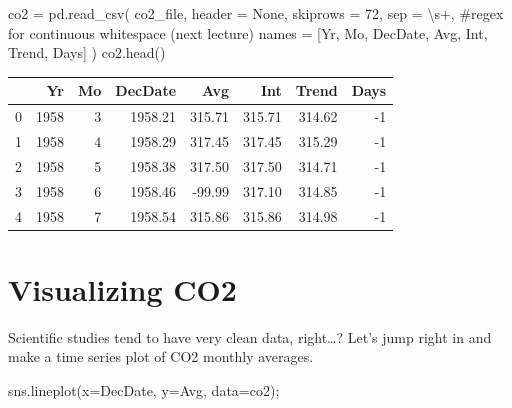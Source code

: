 \documentclass[
  letterpaper,
  DIV=11,
  numbers=noendperiod]{scrreprt}
\newenvironment{Shaded}{\begin{snugshade}}{\end{snugshade}}
\newcommand{\CommentTok}[1]{\textcolor[rgb]{0.37,0.37,0.37}{#1}}
\newcommand{\DecValTok}[1]{\textcolor[rgb]{0.68,0.00,0.00}{#1}}
\newcommand{\NormalTok}[1]{\textcolor[rgb]{0.00,0.23,0.31}{#1}}
\newcommand{\OperatorTok}[1]{\textcolor[rgb]{0.37,0.37,0.37}{#1}}
\newcommand{\StringTok}[1]{\textcolor[rgb]{0.13,0.47,0.30}{#1}}
\newcommand{\VariableTok}[1]{\textcolor[rgb]{0.07,0.07,0.07}{#1}}
\begin{document}
\begin{Shaded}
\begin{Highlighting}[]
\NormalTok{co2 }\OperatorTok{=}\NormalTok{ pd.read\_csv(}
\NormalTok{    co2\_file, header }\OperatorTok{=} \VariableTok{None}\NormalTok{, skiprows }\OperatorTok{=} \DecValTok{72}\NormalTok{,}
\NormalTok{    sep }\OperatorTok{=} \StringTok{\textquotesingle{}\textbackslash{}s+\textquotesingle{}}\NormalTok{, }\CommentTok{\#regex for continuous whitespace (next lecture)}
\NormalTok{    names }\OperatorTok{=}\NormalTok{ [}\StringTok{\textquotesingle{}Yr\textquotesingle{}}\NormalTok{, }\StringTok{\textquotesingle{}Mo\textquotesingle{}}\NormalTok{, }\StringTok{\textquotesingle{}DecDate\textquotesingle{}}\NormalTok{, }\StringTok{\textquotesingle{}Avg\textquotesingle{}}\NormalTok{, }\StringTok{\textquotesingle{}Int\textquotesingle{}}\NormalTok{, }\StringTok{\textquotesingle{}Trend\textquotesingle{}}\NormalTok{, }\StringTok{\textquotesingle{}Days\textquotesingle{}}\NormalTok{]}
\NormalTok{)}
\NormalTok{co2.head()}
\end{Highlighting}
\end{Shaded}

\begin{tabular}{lrrrrrrr}
\toprule
{} &    Yr &  Mo &  DecDate &    Avg &    Int &  Trend &  Days \\
\midrule
0 &  1958 &   3 &  1958.21 & 315.71 & 315.71 & 314.62 &    -1 \\
1 &  1958 &   4 &  1958.29 & 317.45 & 317.45 & 315.29 &    -1 \\
2 &  1958 &   5 &  1958.38 & 317.50 & 317.50 & 314.71 &    -1 \\
3 &  1958 &   6 &  1958.46 & -99.99 & 317.10 & 314.85 &    -1 \\
4 &  1958 &   7 &  1958.54 & 315.86 & 315.86 & 314.98 &    -1 \\
\bottomrule
\end{tabular}

\hypertarget{visualizing-co2}{%
\section{Visualizing CO2}\label{visualizing-co2}}

Scientific studies tend to have very clean data, right\ldots? Let's jump
right in and make a time series plot of CO2 monthly averages.

\begin{Shaded}
\begin{Highlighting}[]
\NormalTok{sns.lineplot(x}\OperatorTok{=}\StringTok{\textquotesingle{}DecDate\textquotesingle{}}\NormalTok{, y}\OperatorTok{=}\StringTok{\textquotesingle{}Avg\textquotesingle{}}\NormalTok{, data}\OperatorTok{=}\NormalTok{co2)}\OperatorTok{;}
\end{Highlighting}
\end{Shaded}
\end{document}
